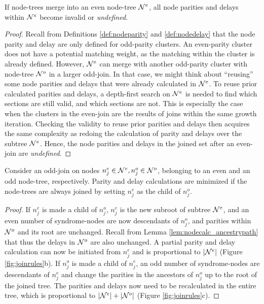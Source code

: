 \begin{lemma}\label{lem:nodecalc_even}
  If node-trees merge into an even node-tree $\mathcal{N}^e$, all node parities and delays within $\mathcal{N}^e$ become invalid or \emph{undefined}. 
\end{lemma}
\begin{proof}
  Recall from Definitions \ref{def:nodeparity} and \ref{def:nodedelay} that the node parity and delay are only defined for odd-parity clusters. An even-parity cluster does not have a potential matching weight, as the matching within the cluster is already defined. However, $\mathcal{N}^e$ can merge with another odd-parity cluster with node-tree $\mathcal{N}^o$ in a larger odd-join. In that case, we might think about ``reusing'' some node parities and delays that were already calculated in $\mathcal{N}^e$. To reuse prior calculated parities and delays, a depth-first search on $\mathcal{N}^e$ is needed to find which sections are still valid, and which sections are not. This is especially the case when the clusters in the even-join are the results of joins within the same growth iteration. Checking the validity to reuse prior parities and delays then acquires the same complexity as redoing the calculation of parity and delays over the subtree $\mathcal{N}^e$. Hence, the node parities and delays in the joined set after an even-join are \emph{undefined}.
\end{proof}

\begin{lemma}\label{lem:nodecalc_odd}
  Consider an odd-join on nodes $n_j^e \in \mathcal{N}^e, n_j^o\in \mathcal{N}^o$, belonging to an even and an odd node-tree, respectively. Parity and delay calculations are minimized if the node-trees are always joined by setting $n_j^e$ as the child of $n_j^o$. 
\end{lemma}
\begin{proof}
  If $n_j^e$ is made a child of $n_j^o$, $n_j^e$ is the new subroot of subtree $\mathcal{N}^e$, and an even number of syndrome-nodes are now descendants of $n_j^o$, and parities within $\mathcal{N}^o$ and its root are unchanged. Recall from Lemma \ref{lem:nodecalc_ancestrypath} that thus the delays in $\mathcal{N}^o$ are also unchanged. A partial parity and delay calculation can now be initiated from $n_j^e$ and is proportional to $|\mathcal{N}^e|$ (Figure \ref{fig:joinrules}b). If $n_j^o$ is made a child of $n_j^e$, an odd number of syndrome-nodes are descendants of $n_j^e$ and change the parities in the ancestors of $n_j^o$ up to the root of the joined tree. The parities and delays now need to be recalculated in the entire tree, which is proportional to $|\mathcal{N}^e| + |\mathcal{N}^o|$ (Figure \ref{fig:joinrules}c). 
\end{proof}

